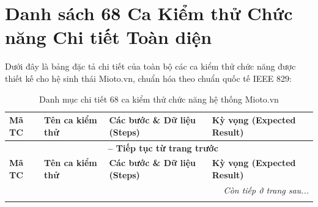 \section{Danh sách 68 Ca Kiểm thử Chức năng Chi tiết Toàn diện}
Dưới đây là bảng đặc tả chi tiết của toàn bộ các ca kiểm thử chức năng được thiết kế cho hệ sinh thái Mioto.vn, chuẩn hóa theo chuẩn quốc tế IEEE 829:

{\small
\begin{longtable}{p{2.3cm}p{3.8cm}p{4.8cm}p{4.2cm}}
\caption{Danh mục chi tiết 68 ca kiểm thử chức năng hệ thống Mioto.vn} \label{tab:full_test_cases} \\
\toprule
\textbf{Mã TC} & \textbf{Tên ca kiểm thử} & \textbf{Các bước \& Dữ liệu (Steps)} & \textbf{Kỳ vọng (Expected Result)} \\
\midrule
\endfirsthead

\multicolumn{4}{c}{{\bfseries \tablename\ \thetable{} -- Tiếp tục từ trang trước}} \\
\toprule
\textbf{Mã TC} & \textbf{Tên ca kiểm thử} & \textbf{Các bước \& Dữ liệu (Steps)} & \textbf{Kỳ vọng (Expected Result)} \\
\midrule
\endhead

\midrule \multicolumn{4}{r}{{\slshape Còn tiếp ở trang sau...}} \\
\endfoot

\bottomrule
\endlastfoot


\end{longtable}}

